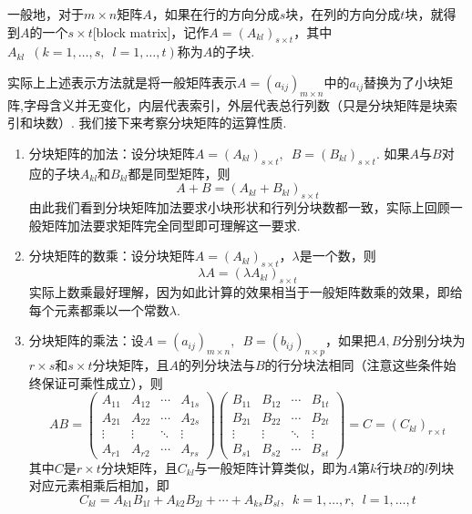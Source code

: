 \begin{definition}
    一般地，对于$m \times n$矩阵$A$，如果在行的方向分成$s$块，在列的方向分成$t$块，就得到$A$的一个$s \times t$[block matrix]，记作$A=(A_{kl})_{s \times t}$，其中$A_{kl}\enspace(k=1,\ldots,s,\enspace l=1,\ldots,t)$称为$A$的子块.
\end{definition}
实际上上述表示方法就是将一般矩阵表示$A=(a_{ij})_{m \times n}$中的$a_{ij}$替换为了小块矩阵,字母含义并无变化，内层代表索引，外层代表总行列数（只是分块矩阵是块索引和块数）. 我们接下来考察分块矩阵的运算性质.
\begin{enumerate}
    \item 分块矩阵的加法：设分块矩阵$A=(A_{kl})_{s \times t},\enspace B=(B_{kl})_{s \times t}$. 如果$A$与$B$对应的子块$A_{kl}$和$B_{kl}$都是同型矩阵，则
          \[A+B=(A_{kl}+B_{kl})_{s \times t}\]
          由此我们看到分块矩阵加法要求小块形状和行列分块数都一致，实际上回顾一般矩阵加法要求矩阵完全同型即可理解这一要求.

    \item 分块矩阵的数乘：设分块矩阵$A=(A_{kl})_{s \times t}$，$\lambda$是一个数，则
          \[\lambda A=(\lambda A_{kl})_{s \times t}\]
          实际上数乘最好理解，因为如此计算的效果相当于一般矩阵数乘的效果，即给每个元素都乘以一个常数$\lambda$.

    \item 分块矩阵的乘法：设$A=(a_{ij})_{m \times n},\enspace B=(b_{ij})_{n \times p}$，如果把$A,B$分别分块为$r \times s$和$s \times t$分块矩阵，且$A$的列分块法与$B$的行分块法相同（注意这些条件始终保证可乘性成立），则
          \[AB=\begin{pmatrix}
                  A_{11} & A_{12} & \cdots & A_{1s} \\
                  A_{21} & A_{22} & \cdots & A_{2s} \\
                  \vdots & \vdots & \ddots & \vdots \\
                  A_{r1} & A_{r2} & \cdots & A_{rs}
              \end{pmatrix}\begin{pmatrix}
                  B_{11} & B_{12} & \cdots & B_{1t} \\
                  B_{21} & B_{22} & \cdots & B_{2t} \\
                  \vdots & \vdots & \ddots & \vdots \\
                  B_{s1} & B_{s2} & \cdots & B_{st}
              \end{pmatrix}=C=(C_{kl})_{r \times t}\]
          其中$C$是$r \times t$分块矩阵，且$C_{kl}$与一般矩阵计算类似，即为$A$第$k$行块$B$的$l$列块对应元素相乘后相加，即
          \[C_{kl}=A_{k1}B_{1l}+A_{k2}B_{2l}+\cdots+A_{ks}B_{sl},\enspace k=1,\ldots,r,\enspace l=1,\ldots,t\]


\end{enumerate}
